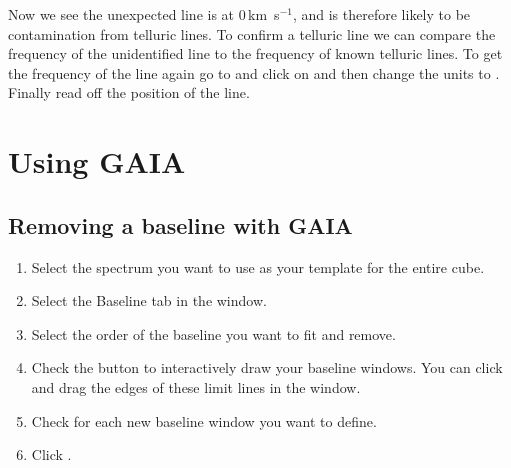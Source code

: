 \documentclass[11pt,oneside,chapters]{starlink}
\newcommand{\kms}{\mbox{$\,$km~s$^{-1}$}}   %
\newcommand{\kms}{\,km~s$^{-1}$}   %
\begin{document}
Now we see the unexpected line is at 0\kms, and is therefore likely to be
contamination from telluric lines. To confirm a telluric line we can compare the
frequency of the unidentified line to the frequency of known telluric lines. 
To get the frequency of the line again go to  and click
on  and then change the units to . Finally read off the position of the line. 


\clearpage
\chapter{Using GAIA}
\label{sec:gaia}

\section{Removing a baseline with GAIA}
\label{sec:gaiabaseline}

\begin{enumerate}[label=(\textbf{\arabic*})]
\item Select the spectrum you want to use as your template for the entire cube.

\item Select the Baseline tab in the  window.

\item Select the order of the baseline you want to fit and remove.

\item Check the  button to
interactively draw your baseline windows. You can click and drag the
edges of these limit lines in the  window.

\item Check  for each new baseline window you want to define.

\item Click .
\end{enumerate}
\end{document}
